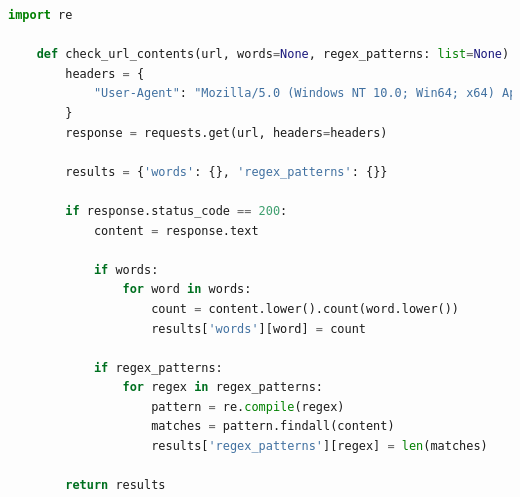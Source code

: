 \begin{lstlisting}[language=python, captionpos=b, caption={Filteren van performance-logs }, label={code:poc7}]
    import re

    def check_url_contents(url, words=None, regex_patterns: list=None):
        headers = {
            "User-Agent": "Mozilla/5.0 (Windows NT 10.0; Win64; x64) AppleWebKit/537.36 (KHTML, like Gecko) Chrome/58.0.3029.110 Safari/537.3"
        }
        response = requests.get(url, headers=headers)

        results = {'words': {}, 'regex_patterns': {}}

        if response.status_code == 200:
            content = response.text

            if words:
                for word in words:
                    count = content.lower().count(word.lower())
                    results['words'][word] = count

            if regex_patterns:
                for regex in regex_patterns:
                    pattern = re.compile(regex)
                    matches = pattern.findall(content)
                    results['regex_patterns'][regex] = len(matches)

        return results
\end{lstlisting}


